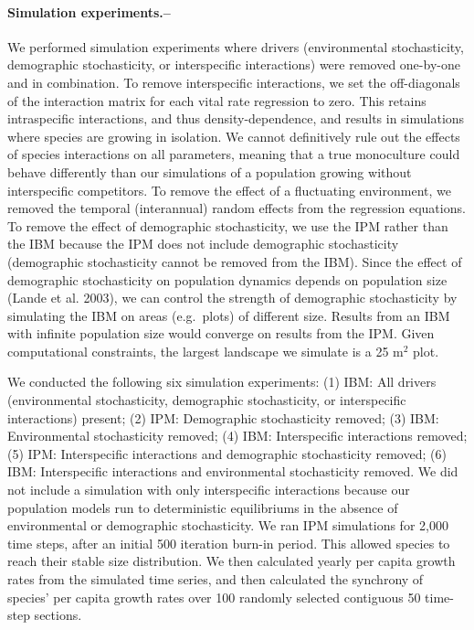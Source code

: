 \documentclass[12pt,]{article}
\begin{document}
\paragraph{Simulation experiments.--}\label{simulation-experiments.}

We performed simulation experiments where drivers (environmental
stochasticity, demographic stochasticity, or interspecific interactions)
were removed one-by-one and in combination. To remove interspecific
interactions, we set the off-diagonals of the interaction matrix for
each vital rate regression to zero. This retains intraspecific
interactions, and thus density-dependence, and results in simulations
where species are growing in isolation. We cannot definitively rule out
the effects of species interactions on all parameters, meaning that a
true monoculture could behave differently than our simulations of a
population growing without interspecific competitors. To remove the
effect of a fluctuating environment, we removed the temporal
(interannual) random effects from the regression equations. To remove
the effect of demographic stochasticity, we use the IPM rather than the
IBM because the IPM does not include demographic stochasticity
(demographic stochasticity cannot be removed from the IBM). Since the
effect of demographic stochasticity on population dynamics depends on
population size (Lande et al. 2003), we can control the strength of
demographic stochasticity by simulating the IBM on areas (e.g.~plots) of
different size. Results from an IBM with infinite population size would
converge on results from the IPM. Given computational constraints, the
largest landscape we simulate is a 25 \(\text{m}^2\) plot.

We conducted the following six simulation experiments: (1) IBM: All
drivers (environmental stochasticity, demographic stochasticity, or
interspecific interactions) present; (2) IPM: Demographic stochasticity
removed; (3) IBM: Environmental stochasticity removed; (4) IBM:
Interspecific interactions removed; (5) IPM: Interspecific interactions
and demographic stochasticity removed; (6) IBM: Interspecific
interactions and environmental stochasticity removed.
We did not include a simulation with only interspecific interactions because our population models run to deterministic equilibriums in the absence of environmental or demographic stochasticity.
We ran IPM simulations for 2,000 time steps, after an initial 500
iteration burn-in period. This allowed species to reach their stable
size distribution. We then calculated yearly per capita growth rates
from the simulated time series, and then calculated the synchrony of
species' per capita growth rates over 100 randomly selected contiguous
50 time-step sections.
\end{document}

